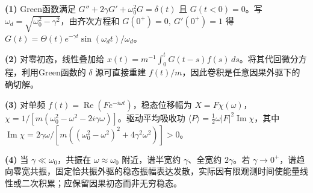 \par\noindent\textbf{(1)} Green函数满足 \(G''+2\gamma G'+\omega_0^2G=\delta(t)\) 且 \(G(t<0)=0\)。写 \(\omega_d=\sqrt{\omega_0^2-\gamma^2}\)，由齐次方程和 \(G(0^+)=0,\ G'(0^+)=1\) 得 \(G(t)=\Theta(t)e^{-\gamma t}\sin(\omega_dt)/\omega_d\)。
\par\noindent\textbf{(2)} 对零初态，线性叠加给 \(x(t)=m^{-1}\int_0^tG(t-s)f(s)\,ds\)。将其代回微分方程，利用Green函数的 \(\delta\) 源可直接重建 \(f(t)/m\)，因此卷积是任意因果外驱下的确切解。
\par\noindent\textbf{(3)} 对单频 \(f(t)=\operatorname{Re}(F e^{-i\omega t})\)，稳态位移幅为 \(X=F\chi(\omega)\)，\(\chi=1/[m(\omega_0^2-\omega^2-2i\gamma\omega)]\)。驱动平均吸收功 \(\langle P\rangle=\tfrac12\omega |F|^2\operatorname{Im}\chi\)，其中 \(\operatorname{Im}\chi=2\gamma\omega/[m((\omega_0^2-\omega^2)^2+4\gamma^2\omega^2)]>0\)。
\par\noindent\textbf{(4)} 当 \(\gamma\ll\omega_0\)，共振在 \(\omega\approx\omega_0\) 附近，谱半宽约 \(\gamma\)、全宽约 \(2\gamma\)。若 \(\gamma\to0^+\)，谱趋向零宽共振，固定恰共振外驱的稳态振幅表达发散，实际因有限观测时间使能量线性或二次积累；应保留因果初态而非无穷稳态。
